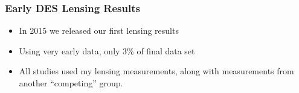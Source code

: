 \documentclass{beamer}
\begin{document}
\frame
{

    \frametitle{Early DES Lensing Results}
 
 
    \begin{itemize}

        \item In 2015 we released our first lensing results

        \item Using very early data, only 3\% of final data set

        \item All studies used my lensing measurements, along with measurements
            from another ``competing'' group.

    \end{itemize}

}
\end{document}
